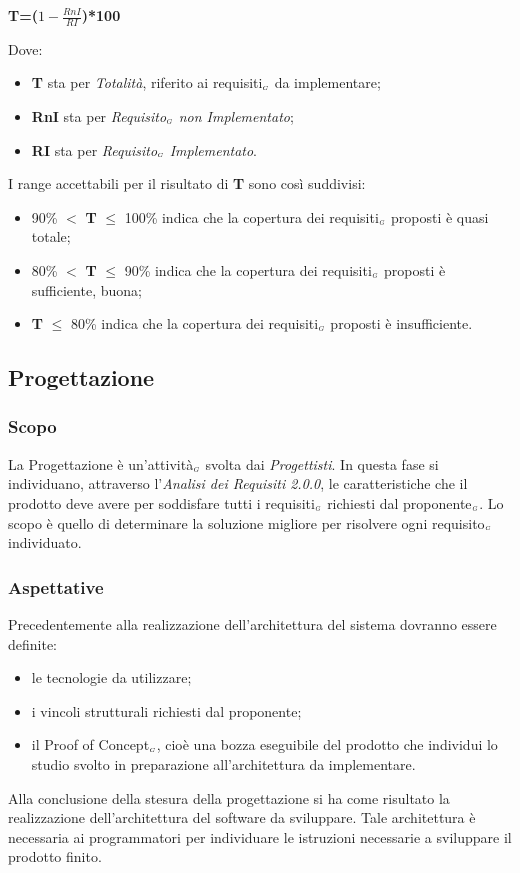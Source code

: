 \begin{center}
	\textbf{T=($1-\frac{RnI}{RI}$)*100}
\end{center}
Dove:
\begin{itemize}
	\item \textbf{T} sta per \textit{Totalità}, riferito ai requisiti$_{\scaleto{G}{3pt}}$ da implementare;
	\item \textbf{RnI} sta per \textit{Requisito$_{\scaleto{G}{3pt}}$ non Implementato};
	\item \textbf{RI} sta per \textit{Requisito$_{\scaleto{G}{3pt}}$ Implementato}.
\end{itemize}
I range accettabili per il risultato di \textbf{T} sono così suddivisi:
\begin{itemize}
	\item 90\% $<$ \textbf{T} $\leq$ 100\% indica che la copertura dei requisiti$_{\scaleto{G}{3pt}}$ proposti è quasi totale;
	\item 80\% $<$ \textbf{T} $\leq$ 90\% indica che la copertura dei requisiti$_{\scaleto{G}{3pt}}$ proposti è sufficiente, buona;
	\item \textbf{T} $\leq$ 80\% indica che la copertura dei requisiti$_{\scaleto{G}{3pt}}$ proposti è insufficiente.
\end{itemize}


\subsection{Progettazione}\label{ProcessiPrimariProgettazione}
\subsubsection{Scopo}\label{ProcessiPrimariProgettazioneScopo}
La Progettazione è un'attività$_{\scaleto{G}{3pt}}$ svolta dai \textit{Progettisti}. In questa fase si individuano, attraverso l'\textit{Analisi dei Requisiti 2.0.0}, le caratteristiche che il prodotto deve avere per soddisfare tutti i requisiti$_{\scaleto{G}{3pt}}$ richiesti dal proponente$_{\scaleto{G}{3pt}}$. Lo scopo è quello di determinare la soluzione migliore per risolvere ogni requisito$_{\scaleto{G}{3pt}}$ individuato.
\subsubsection{Aspettative}\label{ProcessiPrimariProgettazioneAspettative}
Precedentemente alla realizzazione dell'architettura del sistema dovranno essere definite:
\begin{itemize}
	\item le tecnologie da utilizzare;
	\item i vincoli strutturali richiesti dal proponente;
	\item il Proof of Concept$_{\scaleto{G}{3pt}}$, cioè una bozza eseguibile del prodotto che individui lo studio svolto in preparazione all'architettura da implementare. 
\end{itemize}
Alla conclusione della stesura della progettazione si ha come risultato la realizzazione dell'architettura del software da sviluppare. Tale architettura è necessaria ai programmatori per individuare le istruzioni necessarie a sviluppare il prodotto finito. 
